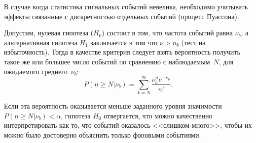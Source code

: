 В случае когда статистика сигнальных событий невелика, необходимо
учитывать эффекты связанные с дискретностью отдельных
событий (процесс Пуассона).

\begin{comment}
В частности, \eqref{eq:cls-definition} значит, что даже
в случае отсутствия ожидаемых фоновых событий в сигнальной
области~($\nu_b = 0$),
любая гипотеза предсказывающая число событий меньшее
$- \text{ln} ~\alpha$ будет отвергнута. Для некоторых
значений $\alpha$ минимальное
число событий приведено в таблице~\ref{tab:cls-alpha-examples}.
\begin{table}[ht]
    \centering
    \begin{tabular}{r|c}
        $\alpha$ & $s$ \\ \hline
        $0{,}1$ & $2{,}3$ \\
        $0{,}01$ & $4{,}6$ \\
        $1-\text{erfc}(5\sigma)$ & $15{,}0$
    \end{tabular}
    \caption{Минимальное число событий для различных $\alpha$}
    \label{tab:cls-alpha-examples}
\end{table}
\end{comment}

Допустим, нулевая гипотеза ($H_0$) состоит в том,
что частота событий равна $\nu_b$, а альтернативная
гипотеза $H_1$ заключается в том что $\nu > n_b$
(тест на избыточность).
Тогда в качестве критерия следует взять вероятность получить
такое же или большее число событий по сравнению с
наблюдаемым~$N$, для ожидаемого среднего~$\nu_b$:
\begin{equation}
    P(n \ge N|\nu_b) = \sum\limits_{k=N}^{\infty} \frac{\nu_b^n e^{-\nu_b}}{n!}.
    \label{eq:poisson-no-bg}
\end{equation}

Если эта вероятность оказывается меньше заданного
уровня значимости $P(n \ge N|\nu_b) < \alpha$, гипотеза $H_0$ отвергается,
что можно качественно интерпретировать как то, что событий оказалось
<<слишком много>>, чтобы их можно было достоверно объяснить
только фоновыми событиями.

%
%


